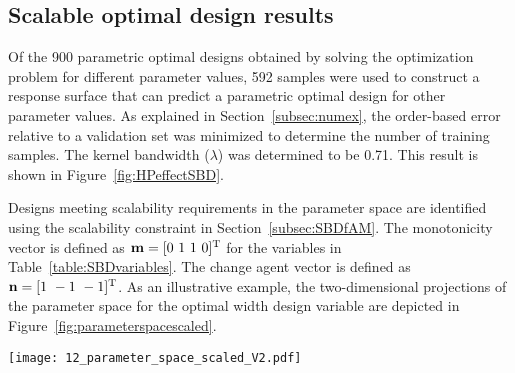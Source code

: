 \subsection{Scalable optimal design results} \label{subsec:scalabledesignspace}

Of the 900 parametric optimal designs obtained by solving the optimization problem for different parameter values, 592 samples were used to construct a response surface that can predict a parametric optimal design for other parameter values. As explained in Section~\ref{subsec:numex}, the order-based error relative to a validation set was minimized to determine the number of training samples. The kernel bandwidth ($\lambda$) was determined to be 0.71. This result is shown in Figure~\ref{fig:HPeffectSBD}.

Designs meeting scalability requirements in the parameter space are identified using the scalability constraint in Section~\ref{subsec:SBDfAM}. The monotonicity vector is defined as $\mathbf{m} = [0~1~1~0]^{\text T}$ for the variables in Table~\ref{table:SBDvariables}. The {change agent} vector is defined as $\mathbf{n} = [1~-1~-1]^{\text T}$. As an illustrative example, the two-dimensional projections of the parameter space for the optimal width design variable are depicted in Figure~\ref{fig:parameterspacescaled}.
\begin{figure*}%
	\centering
	\texttt{[image: 12\_parameter\_space\_scaled\_V2.pdf]} %
	\caption{ \label{fig:parameterspacescaled} Projections of the optimal width design variable $\hat{x_3}^{*}$ with non-scalable regions of the parameter space hatched}
\end{figure*}
\begin{figure*}[h!]
	\centering
	 \hspace{0.02\textwidth}%
	\caption{Effect of number of training points and kernel bandwidth on order-based error}
	\label{fig:HPeffectSBD}
\end{figure*}

